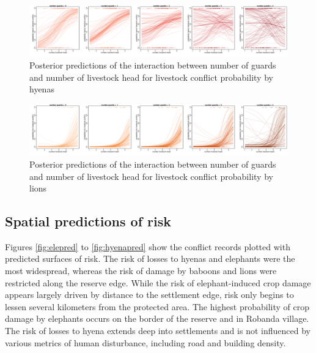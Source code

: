 \documentclass[12pt,]{article}
\begin{document}
\begin{figure}[H]
    \centering
    \includegraphics[width=\textwidth]{Figures/hyena_stick_triptych.pdf} 
    \caption{Posterior predictions of the interaction between number of guards and number of livestock head for livestock conflict probability by hyenas}
    \label{fig:hyeans_int_truptych}
\end{figure}

\begin{figure}[H]
    \centering
    \includegraphics[width=\textwidth]{Figures/lion_int_triptych.pdf} 
    \caption{Posterior predictions of the interaction between number of guards and number of livestock head for livestock conflict probability by lions}
    \label{fig:leo_int_tryptych}
\end{figure}


\subsection{Spatial predictions of risk}

Figures \ref{fig:elepred} to \ref{fig:hyenapred} show the conflict records plotted with predicted surfaces of risk. The risk of losses to hyenas and elephants were the most widespread, whereas the risk of damage by baboons and lions were restricted along the reserve edge. While the risk of elephant-induced crop damage appears largely driven by distance to the settlement edge, risk only begins to lessen several kilometers from the protected area. The highest probability of crop damage by elephants occurs on the border of the reserve and in Robanda village. The risk of losses to hyena extends deep into settlements and is not influenced by various metrics of human disturbance, including road and building density.
\end{document}
